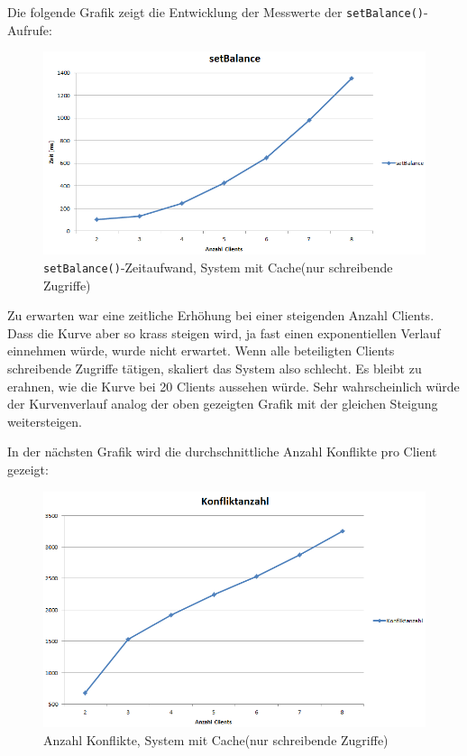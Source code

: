 Die folgende Grafik zeigt die Entwicklung der Messwerte der \texttt{setBalance()}-Aufrufe:
\begin{figure}[H]
\begin{center}
\includegraphics[scale=0.6]{images_MessErgebnisse/incrementCacheSetBalance.png}
\end{center}
\caption{\texttt{setBalance()}-Zeitaufwand, System mit Cache(nur schreibende Zugriffe)}
\end{figure}

Zu erwarten war eine zeitliche Erhöhung bei einer steigenden Anzahl Clients. Dass die Kurve aber so krass steigen wird, ja fast einen exponentiellen Verlauf einnehmen würde, wurde nicht erwartet. Wenn alle beteiligten Clients schreibende Zugriffe tätigen, skaliert das System also schlecht. Es bleibt zu erahnen, wie die Kurve bei 20 Clients aussehen würde. Sehr wahrscheinlich würde der Kurvenverlauf analog der oben gezeigten Grafik mit der gleichen Steigung weitersteigen. \newline

In der nächsten Grafik wird die durchschnittliche Anzahl Konflikte pro Client gezeigt:
\begin{figure}[H]
\begin{center}
\includegraphics[scale=0.6]{images_MessErgebnisse/incrementCacheKonfliktzahl.png}
\end{center}
\caption{Anzahl Konflikte, System mit Cache(nur schreibende Zugriffe)}
\end{figure}

